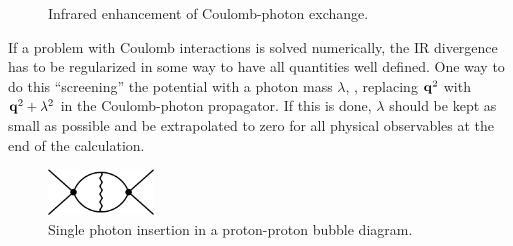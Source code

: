 \begin{figure}[htbp]
\centering
\begin{minipage}{0.25\textwidth}
 \centering
\end{minipage}
\hspace{0.5em}
\begin{minipage}{0.65\textwidth}
 \centering
\end{minipage}
\caption{Infrared enhancement of Coulomb-photon exchange.}
\label{fig:OneTwoPhoton}
\end{figure}

If a problem with Coulomb interactions is solved numerically, the 
IR divergence has to be regularized in some way to have all quantities well 
defined.  One way to do this ``screening'' the potential with a photon mass 
$\lambda$, \ie, replacing $\mathbf{q}^2$ with $\mathbf{q}^2 + \lambda^2$ in the 
Coulomb-photon propagator.  If this is done, $\lambda$ should be kept as small 
as possible and be extrapolated to zero for all physical observables at the end 
of the calculation.

\begin{figure}[htbp]
\centering
\includegraphics[clip,width=0.25\textwidth]{SinglePhotonBubble}
\caption{Single photon insertion in a proton-proton bubble diagram.}
\label{fig:SinglePhotonBubble}
\end{figure}

